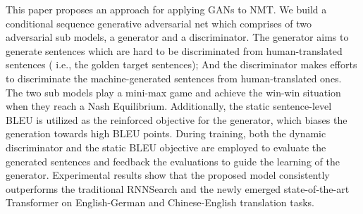 This paper proposes an approach for applying GANs to NMT. We build a conditional sequence generative adversarial net which comprises of two adversarial sub models, a generator and a discriminator. The generator aims to generate sentences which are hard to be discriminated from human-translated sentences ( i.e., the golden target sentences); And the discriminator makes efforts to discriminate the machine-generated sentences from human-translated ones. The two sub models play a mini-max game and achieve the win-win situation when they reach a Nash Equilibrium. Additionally, the static sentence-level BLEU is utilized as the reinforced objective for the generator, which biases the generation towards high BLEU points. During training, both the dynamic discriminator and the static BLEU objective are employed to evaluate the generated sentences and feedback the evaluations to guide the learning of the generator. Experimental results show that the proposed model consistently outperforms the traditional RNNSearch and the newly emerged state-of-the-art Transformer on English-German and Chinese-English translation tasks.
